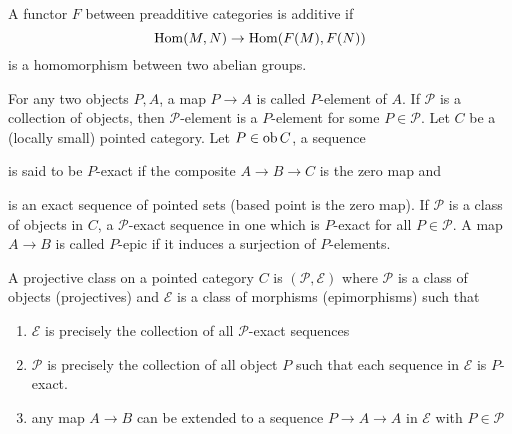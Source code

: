 \documentclass{report}
\begin{document}
\begin{definition}
    A functor $F$ between preadditive categories is additive if 
    $$
        \operatorname{Hom}(M, N) \to \operatorname{Hom}(F(M), F(N))
    $$
    is a homomorphism between two abelian groups.
\end{definition}

\begin{definition}
    For any two objects $P, A$, a map $P \to A$ is called $P$-element of $A$. If $\mathcal{P}$ is a collection of objects, then $\mathcal{P}$-element is a $P$-element for some $P \in \mathcal{P}$. Let $C$ be a (locally small) pointed category. Let $P \in \operatorname{ob} C$, a sequence 
    \begin{center}
    \end{center}
    is said to be $P$-exact if the composite $A \to B \to C$ is the zero map and 
    \begin{center}
    \end{center}
    is an exact sequence of pointed sets (based point is the zero map). If $\mathcal{P}$ is a class of objects in $C$, a $\mathcal{P}$-exact sequence in one which is $P$-exact for all $P \in \mathcal{P}$. A map $A \to B$ is called $P$-epic if it induces a surjection of $P$-elements.
\end{definition}

\begin{definition}
    A projective class on a pointed category $C$ is $(\mathcal{P}, \mathcal{E})$ where $\mathcal{P}$ is a class of objects (projectives) and $\mathcal{E}$ is a class of morphisms (epimorphisms) such that
    \begin{enumerate}
        \item $\mathcal{E}$ is precisely the collection of all $\mathcal{P}$-exact sequences
        \item $\mathcal{P}$ is precisely the collection of all object $P$ such that each sequence in $\mathcal{E}$ is $P$-exact.
        \item any map $A \to B$ can be extended to a sequence $P \to A \to A$ in $\mathcal{E}$ with $P \in \mathcal{P}$
    \end{enumerate}
\end{definition}
\end{document}
